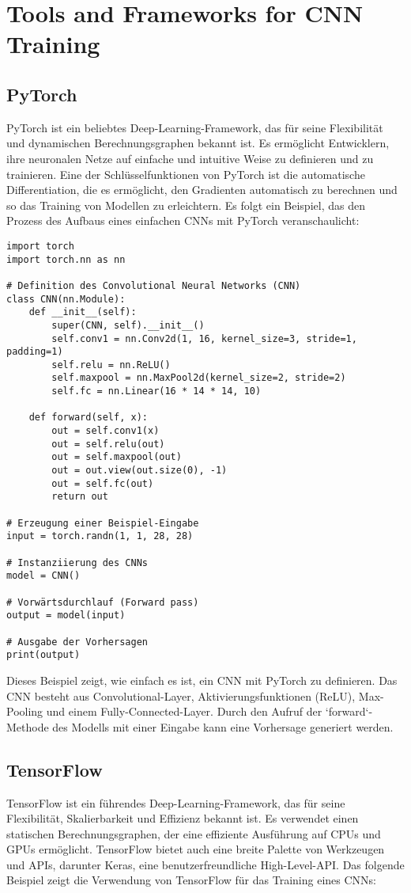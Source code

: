 
\chapter{Tools and Frameworks for CNN Training}

\section{PyTorch}
PyTorch ist ein beliebtes Deep-Learning-Framework, das für seine Flexibilität und dynamischen Berechnungsgraphen bekannt ist. Es ermöglicht Entwicklern, ihre neuronalen Netze auf einfache und intuitive Weise zu definieren und zu trainieren. Eine der Schlüsselfunktionen von PyTorch ist die automatische Differentiation, die es ermöglicht, den Gradienten automatisch zu berechnen und so das Training von Modellen zu erleichtern. Es folgt ein Beispiel, das den Prozess des Aufbaus eines einfachen CNNs mit PyTorch veranschaulicht:

\begin{lstlisting}
import torch
import torch.nn as nn

# Definition des Convolutional Neural Networks (CNN)
class CNN(nn.Module):
    def __init__(self):
        super(CNN, self).__init__()
        self.conv1 = nn.Conv2d(1, 16, kernel_size=3, stride=1, padding=1)
        self.relu = nn.ReLU()
        self.maxpool = nn.MaxPool2d(kernel_size=2, stride=2)
        self.fc = nn.Linear(16 * 14 * 14, 10)

    def forward(self, x):
        out = self.conv1(x)
        out = self.relu(out)
        out = self.maxpool(out)
        out = out.view(out.size(0), -1)
        out = self.fc(out)
        return out

# Erzeugung einer Beispiel-Eingabe
input = torch.randn(1, 1, 28, 28)

# Instanziierung des CNNs
model = CNN()

# Vorwärtsdurchlauf (Forward pass)
output = model(input)

# Ausgabe der Vorhersagen
print(output)
\end{lstlisting}

Dieses Beispiel zeigt, wie einfach es ist, ein CNN mit PyTorch zu definieren. Das CNN besteht aus Convolutional-Layer, Aktivierungsfunktionen (ReLU), Max-Pooling und einem Fully-Connected-Layer. Durch den Aufruf der `forward`-Methode des Modells mit einer Eingabe kann eine Vorhersage generiert werden.

\section{TensorFlow}
TensorFlow ist ein führendes Deep-Learning-Framework, das für seine Flexibilität, Skalierbarkeit und Effizienz bekannt ist. Es verwendet einen statischen Berechnungsgraphen, der eine effiziente Ausführung auf CPUs und GPUs ermöglicht. TensorFlow bietet auch eine breite Palette von Werkzeugen und APIs, darunter Keras, eine benutzerfreundliche High-Level-API. Das folgende Beispiel zeigt die Verwendung von TensorFlow für das Training eines CNNs:

